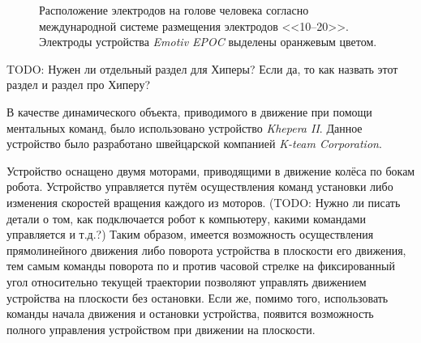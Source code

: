 \documentclass[12pt,fleqn]{article}
\begin{document}
	\begin{figure}[H]
		\caption{Расположение электродов на голове человека согласно международной системе размещения электродов <<10--20>>. Электроды устройства {\it Emotiv EPOC} выделены оранжевым цветом.}
	\label{electrode_map}
	\end{figure}

	\par TODO: Нужен ли отдельный раздел для Хиперы? Если да, то как назвать этот раздел и раздел про Хиперу?
	\par В качестве динамического объекта, приводимого в движение при помощи ментальных команд, было использовано устройство {\it Khepera II}. Данное устройство было разработано швейцарской компанией {\it K-team Corporation}.
	\par Устройство оснащено двумя моторами, приводящими в движение колёса по бокам робота. Устройство управляется путём осуществления команд установки либо изменения скоростей вращения каждого из моторов. (TODO: Нужно ли писать детали о том, как подключается робот к компьютеру, какими командами управляется и т.д.?) Таким образом, имеется возможность осуществления прямолинейного движения либо поворота устройства в плоскости его движения, тем самым команды поворота по и против часовой стрелке на фиксированный угол относительно текущей траектории позволяют управлять движением устройства на плоскости без остановки. Если же, помимо того, использовать команды начала движения и остановки устройства, появится возможность полного управления устройством при движении на плоскости.
\end{document}
